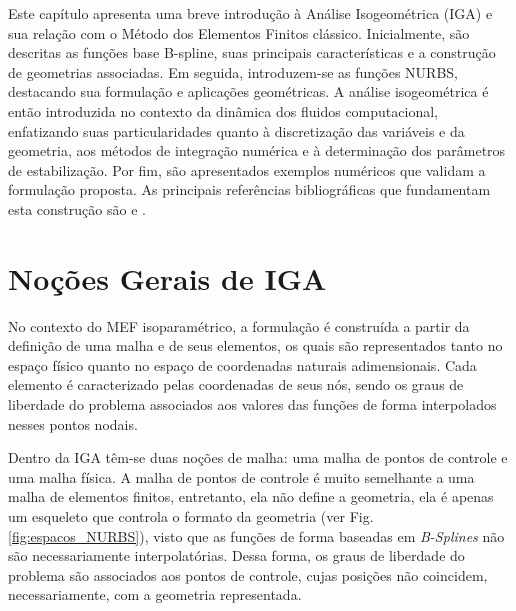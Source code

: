 \documentclass[tese_patricia]{subfiles}
\begin{document}
Este capítulo apresenta uma breve introdução à Análise Isogeométrica (IGA) e sua relação com o Método dos Elementos Finitos clássico. Inicialmente, são descritas as funções base B-spline, suas principais características e a construção de geometrias associadas. Em seguida, introduzem-se as funções NURBS, destacando sua formulação e aplicações geométricas. A análise isogeométrica é então introduzida no contexto da dinâmica dos fluidos computacional, enfatizando suas particularidades quanto à discretização das variáveis e da geometria, aos métodos de integração numérica e à determinação dos parâmetros de estabilização. Por fim, são apresentados exemplos numéricos que validam a formulação proposta. As principais referências bibliográficas que fundamentam esta construção são  e . 


\section{Noções Gerais de IGA}

No contexto do MEF isoparamétrico, a formulação é construída a partir da definição de uma malha e de seus elementos, os quais são representados tanto no espaço físico quanto no espaço de coordenadas naturais adimensionais.  Cada elemento é caracterizado pelas coordenadas de seus nós, sendo os graus de liberdade do problema associados aos valores das funções de forma interpolados nesses pontos nodais.

Dentro da IGA têm-se duas noções de malha: uma malha de pontos de controle e uma malha física. A malha de pontos de controle é muito semelhante a uma malha de elementos finitos, entretanto, ela não define a geometria, ela é apenas um esqueleto que controla o formato da geometria (ver Fig. \ref{fig:espacos_NURBS}), visto que as funções de forma baseadas em \textit{B-Splines} não são necessariamente interpolatórias. Dessa forma, os graus de liberdade do problema são associados aos pontos de controle, cujas posições não coincidem, necessariamente, com a geometria representada.

\aquiiii
\end{document}
